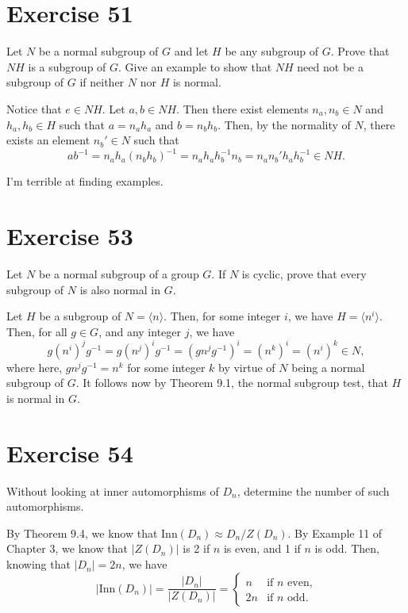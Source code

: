 \documentclass[12pt]{article}
\newcommand{\inn}{\mbox{Inn}}
\begin{document}
\section*{Exercise 51}

Let $N$ be a normal subgroup of $G$ and let $H$
be any subgroup of $G$.  Prove that $NH$ is a subgroup of $G$.
Give an example to show that $NH$ need not be a subgroup of $G$ if neither
$N$ nor $H$ is normal.

Notice that $e\in NH$.  Let $a,b\in NH$.  Then there exist
elements $n_a,n_b\in N$ and $h_a,h_b\in H$ such that $a=n_ah_a$
and $b=n_bh_b$.  Then, by the normality of $N$, there exists
an element $n_b'\in N$ such that
\begin{equation*}
ab^{-1}=n_ah_a(n_bh_b)^{-1}=n_ah_ah_b^{-1}n_b=n_an_b'h_ah_b^{-1}\in NH.
\end{equation*}

I'm terrible at finding examples.

\section*{Exercise 53}

Let $N$ be a normal subgroup of a group $G$.  If $N$ is cyclic,
prove that every subgroup of $N$ is also normal in $G$.

Let $H$ be a subgroup of $N=\langle n\rangle$.  Then, for some
integer $i$, we have $H=\langle n^i\rangle$.  Then, for all $g\in G$,
and any integer $j$, we have
\begin{equation*}
g(n^i)^jg^{-1}=g(n^j)^ig^{-1}=(gn^jg^{-1})^i=(n^k)^i=(n^i)^k\in N,
\end{equation*}
where here, $gn^jg^{-1}=n^k$ for some integer $k$ by
virtue of $N$ being a normal subgroup of $G$.  It follows
now by Theorem 9.1, the normal subgroup test, that $H$ is normal in $G$.

\section*{Exercise 54}

Without looking at inner automorphisms of $D_n$, determine the number
of such automorphisms.

By Theorem 9.4, we know that $\inn(D_n)\approx D_n/Z(D_n)$.
By Example 11 of Chapter 3, we know that $|Z(D_n)|$ is 2 if
$n$ is even, and 1 if $n$ is odd.  Then, knowing that $|D_n|=2n$,
we have
\begin{equation*}
|\inn(D_n)|=\frac{|D_n|}{|Z(D_n)|}=\left\{\begin{array}{ll}
n & \mbox{if $n$ even,} \\
2n & \mbox{if $n$ odd.}
\end{array}\right.
\end{equation*}
\end{document}
